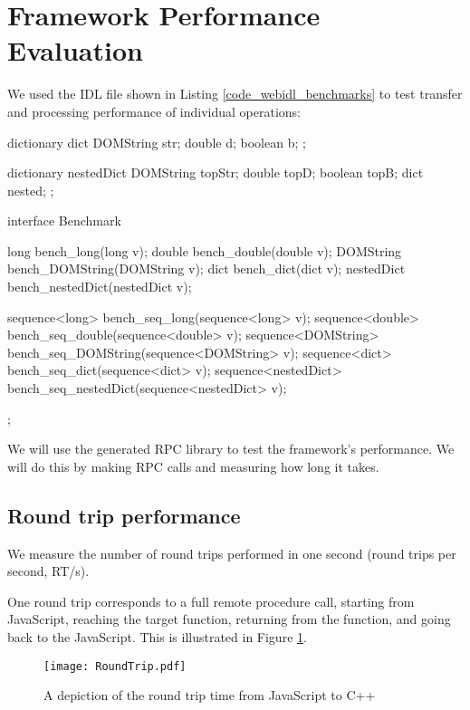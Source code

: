 \section{Framework Performance Evaluation} %
\label{sec:performance_evaluation}
We used the IDL file shown in Listing \ref{code_webidl_benchmarks} to test transfer and processing performance of individual operations:

\begin{code}
dictionary dict {
  DOMString str;
  double d;
  boolean b;
};

dictionary nestedDict {
  DOMString topStr;
  double topD;
  boolean topB;
  dict nested;
};

interface Benchmark{
  long bench_long(long v);
  double bench_double(double v);
  DOMString bench_DOMString(DOMString v);
  dict bench_dict(dict v);
  nestedDict bench_nestedDict(nestedDict v);

  sequence<long> bench_seq_long(sequence<long> v);
  sequence<double> bench_seq_double(sequence<double> v);
  sequence<DOMString> bench_seq_DOMString(sequence<DOMString> v);
  sequence<dict> bench_seq_dict(sequence<dict> v);
  sequence<nestedDict> bench_seq_nestedDict(sequence<nestedDict> v);
};
\end{code}

We will use the generated RPC library to test the framework's performance. We will do this by making RPC calls and measuring how long it takes.

\subsection{Round trip performance}\label{round-trip-performance}

We measure the number of round trips performed in one second (round trips per second, RT/s).

One round trip corresponds to a full remote procedure call, starting from JavaScript, reaching the target function, returning from the function, and going back to the JavaScript. This is illustrated in Figure \ref{fig:rpc_roundtrip}.


\begin{figure}
    \centering
    \texttt{[image: RoundTrip.pdf]} 
    \caption{A depiction of the round trip time from JavaScript to C++}
    \label{fig:rpc_roundtrip}
\end{figure}


